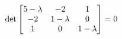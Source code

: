 \documentclass[preview]{standalone}
\begin{document}
\begin{align*}
\special{dvisvgm:raw <g id='unique000'>}\det \begin{bmatrix}5-\lambda & -2 & 1 \\-2 & 1-\lambda & 0 \\1 & 0 & 1-\lambda\end{bmatrix} = 0\special{dvisvgm:raw </g>}
\end{align*}
\end{document}
